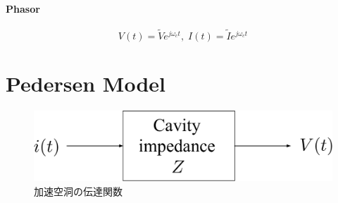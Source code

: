\documentclass[book]{jlreq}
\begin{document}
\paragraph{Phasor}
\begin{equation}
    V(t) = \tilde{V}e^{j\omega_c t}, \; I(t) = \tilde{I}e^{j\omega_c t}
\end{equation}

\section{Pedersen Model \cite{Pedersen} \cite{Ninomiya}}

\begin{figure}[hbt]
    \begin{center}
        \includegraphics[width=12cm,clip]{figs/Cavity_TF.pdf}
        \caption{加速空洞の伝達関数}
        \label{fig:Cavity_TF}
    \end{center}
\end{figure}
\end{document}
